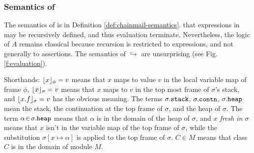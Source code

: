 \subsubsection{Semantics of \SpecO}
The semantics of \SpecO  %
is  in Definition \ref{def:chainmail-semantics}. 
 that expressions in \Loo may be recursively defined, and thus evaluation 
 terminate. Nevertheless, the logic of $A$ remains classical because recursion is restricted
to expressions, and not generally to assertions.
The semantics of $\hookrightarrow$ are unsurprising (see Fig.\ref{f:evaluation}).

Shorthands:  
 $\lfloor x \rfloor_{\phi} = v$  means that $x$ maps to
value $v$ in the local variable map of frame $\phi$, $\lfloor x \rfloor_{\sigma} = v$ means that $x$ 
maps to $v$ in the top most frame of $\sigma$'s stack, and $\lfloor x.f \rfloor_{\sigma} = v$
has the obvious meaning. The terms $\sigma.{\texttt{stack}}$,  
$\sigma.{\texttt{contn}}$, 
$\sigma.{\texttt{heap}}$     mean the stack, 
the continuation at the
top frame of $\sigma$, %
and the heap of $\sigma$.
The term $\alpha\!\in\!\sigma.{\texttt{heap}}$ means that $\alpha$ is in the domain of the heap of $\sigma$, and \emph{$x$ fresh in $\sigma$} means that 
$x$ isn't in the variable map of the top frame of $\sigma$, 
while the substitution  $\sigma[x \mapsto \alpha]$ is applied to the top frame of $\sigma$.
$C\in M$ means that class $C$ is in the domain of module $M$. 

